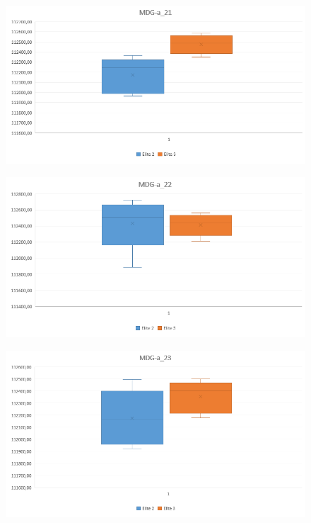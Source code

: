 	\begin{figure}[H]
		\centering
		\includegraphics[scale=0.65]{img/2point_2vs3/MDG1}
		\caption{}
		\label{MDGa1_2Puntos}
		
	\end{figure}

	\begin{figure}[H]
		\centering
		\includegraphics[scale=0.65]{img/2point_2vs3/MDG2}
		\caption{}
		\label{MDGa2_2Puntos}
	
	\end{figure}
	
		\begin{figure}[H]
		\centering
		\includegraphics[scale=0.65]{img/2point_2vs3/MDG3}
		\caption{}
		\label{MDGa3_2Puntos}
		
	\end{figure}
		
